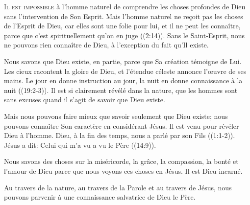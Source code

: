 \dvrule







\lettrine{I}{l est impossible} à l'homme naturel de comprendre
 les choses profondes de Dieu sans l'intervention de Son Esprit.
 \Og Mais l'homme naturel ne re\c{c}oit pas les choses de l'Esprit de Dieu,
 car elles sont une folie pour lui, et il ne peut les connaître,
 parce que c'est spirituellement qu'on en juge \Fg{}
 ((2:14)).
 Sans le Saint-Esprit, nous ne pouvons rien connaître de Dieu,
 à l'exception du fait qu'Il existe.

Nous savons que Dieu existe, en partie, parce que Sa création
 témoigne de Lui. \Og Les cieux racontent la gloire de Dieu,
 et l'étendue céleste annonce l'\oe{}uvre de ses mains.
 Le jour en donne instruction au jour, la nuit en donne connaissance
 à la nuit \Fg{} ((19:2-3)).
 Il est si clairement révélé dans la nature, que les hommes sont
 sans excuses quand il s'agit de savoir que Dieu existe.

Mais nous pouvons faire mieux que savoir seulement que Dieu existe;
 nous pouvons connaître Son caractère en considérant Jésus.
 Il est venu pour révéler Dieu à l'homme.
 \Og Dieu, à la fin des temps, nous a parlé par son Fils \Fg{}
 ((1:1-2)).
 Jésus a dit: 
 \Og Celui qui m'a vu a vu le Père \Fg{} ((14:9)).

Nous savons des choses sur la miséricorde, la grâce, la compassion,
 la bonté et l'amour de Dieu parce que nous voyons ces choses en Jésus.
 Il est Dieu incarné.

Au travers de la nature, au travers de la Parole et au travers de Jésus,
 nous pouvons parvenir à une connaissance salvatrice de Dieu le Père.


